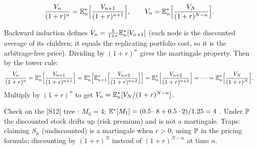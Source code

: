 \documentclass[10pt]{article}
\begin{document}
\[\frac{V_n}{(1+r)^n}=\mathbb{E}^*_n\Big[\frac{V_{n+1}}{(1+r)^{n+1}}\Big],\qquad V_n=\mathbb{E}^*_n\Big[\frac{V_N}{(1+r)^{N-n}}\Big].\]
\begin{deriv}
Backward induction defines $V_n=\frac{1}{1+r}\mathbb{E}^*_n[V_{n+1}]$ (each node is the discounted average of its children; it equals the replicating portfolio cost, so it is the arbitrage-free price). Dividing by $(1+r)^n$ gives the martingale property. Then by the tower rule:
\[\frac{V_n}{(1+r)^n}=\mathbb{E}^*_n\Big[\frac{V_{n+1}}{(1+r)^{n+1}}\Big]=\mathbb{E}^*_n\Big[\mathbb{E}^*_{n+1}\Big[\frac{V_{n+2}}{(1+r)^{n+2}}\Big]\Big]=\mathbb{E}^*_n\Big[\frac{V_{n+2}}{(1+r)^{n+2}}\Big]=\cdots=\mathbb{E}^*_n\Big[\frac{V_N}{(1+r)^N}\Big].\]
Multiply by $(1+r)^n$ to get $V_n=\mathbb{E}^*_n[V_N/(1+r)^{N-n}]$.
\end{deriv}
\begin{where}
\end{where}
\begin{exam}
Check on the [S12] tree \beyond: $M_0=4$; $\mathbb{E}^*[M_1]=(0.5\cdot8+0.5\cdot2)/1.25=4$ \checkmark. Under $\mathbb{P}$ the discounted stock drifts up (risk premium) and is not a martingale. Traps: claiming $S_n$ (undiscounted) is a martingale when $r>0$; using $\mathbb{P}$ in the pricing formula; discounting by $(1+r)^N$ instead of $(1+r)^{N-n}$ at time $n$.
\end{exam}
\end{document}
